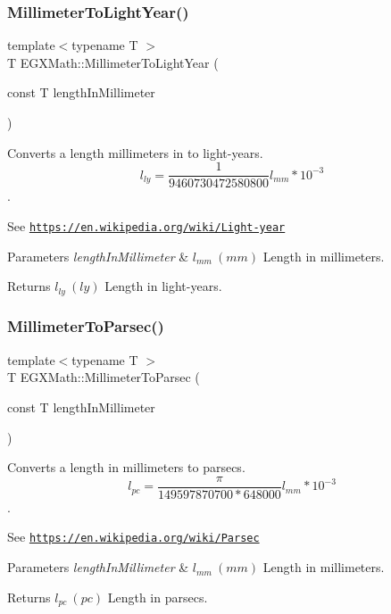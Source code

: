 \subsubsection{\texorpdfstring{Millimeter\+To\+Light\+Year()}{MillimeterToLightYear()}}
{\footnotesize\ttfamily template$<$typename T $>$ \\
T E\+G\+X\+Math\+::\+Millimeter\+To\+Light\+Year (\begin{DoxyParamCaption}\item[{const T}]{length\+In\+Millimeter }\end{DoxyParamCaption})}



Converts a length millimeters in to light-\/years. \[ l_{ly}= \frac{1}{9460730472580800} l_{mm} * 10^{-3} \]. 

See \href{https://en.wikipedia.org/wiki/Light-year}{\tt https\+://en.\+wikipedia.\+org/wiki/\+Light-\/year} 
\begin{DoxyParams}{Parameters}
{\em length\+In\+Millimeter} & $ l_{mm}\ (mm)$ Length in millimeters. \\
\hline
\end{DoxyParams}
\begin{DoxyReturn}{Returns}
$ l_{ly}\ (ly)$ Length in light-\/years. 
\end{DoxyReturn}
\mbox{\label{group___e_g_x_math-_conversions-_length_conversions-_millimeter-_astronomical_ga55cf82aa51af1d469ae58cc5d03570f7}} 
\subsubsection{\texorpdfstring{Millimeter\+To\+Parsec()}{MillimeterToParsec()}}
{\footnotesize\ttfamily template$<$typename T $>$ \\
T E\+G\+X\+Math\+::\+Millimeter\+To\+Parsec (\begin{DoxyParamCaption}\item[{const T}]{length\+In\+Millimeter }\end{DoxyParamCaption})}



Converts a length in millimeters to parsecs. \[ l_{pc}=\frac{\pi}{149597870700 * 648000} l_{mm} * 10^{-3} \]. 

See \href{https://en.wikipedia.org/wiki/Parsec}{\tt https\+://en.\+wikipedia.\+org/wiki/\+Parsec} 
\begin{DoxyParams}{Parameters}
{\em length\+In\+Millimeter} & $ l_{mm}\ (mm)$ Length in millimeters. \\
\hline
\end{DoxyParams}
\begin{DoxyReturn}{Returns}
$ l_{pc}\ (pc)$ Length in parsecs. 
\end{DoxyReturn}
